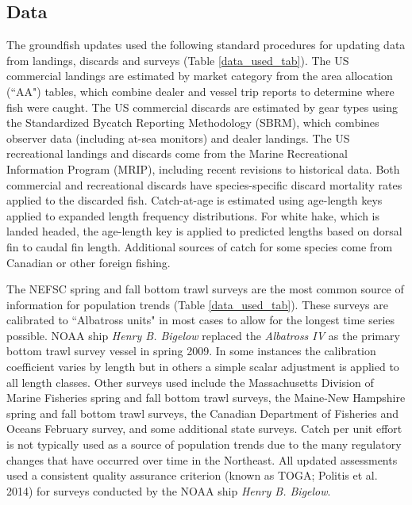 \subsection{Data}
The groundfish updates used the following standard procedures for updating data from landings, discards and surveys (Table \ref{data_used_tab}). The US commercial landings are estimated by market category from the area allocation (``AA") tables, which combine dealer and vessel trip reports to determine where fish were caught. The US commercial discards are estimated by gear types using the Standardized Bycatch Reporting Methodology (SBRM), which combines observer data (including at-sea monitors) and dealer landings. The US recreational landings and discards come from the Marine Recreational Information Program (MRIP), including recent revisions to historical data. Both commercial and recreational discards have species-specific discard mortality rates applied to the discarded fish. Catch-at-age is estimated using age-length keys applied to expanded length frequency distributions. For white hake, which is landed headed, the age-length key is applied to predicted lengths based on dorsal fin to caudal fin length.  Additional sources of catch for some species come from Canadian or other foreign fishing. 

The NEFSC spring and fall bottom trawl surveys are the most common source of information for population trends (Table \ref{data_used_tab}). These surveys are calibrated to ``Albatross units" in most cases to allow for the longest time series possible. NOAA ship \textit{Henry B. Bigelow} replaced the \textit{Albatross IV} as the primary bottom trawl survey vessel in spring 2009.  In some instances the calibration coefficient varies by length but in others a simple scalar adjustment is applied to all length classes. Other surveys used include the Massachusetts Division of Marine Fisheries spring and fall bottom trawl surveys, the Maine-New Hampshire spring and fall bottom trawl surveys, the Canadian Department of Fisheries and Oceans February survey, and some additional state surveys. Catch per unit effort is not typically used as a source of population trends due to the many regulatory changes that have occurred over time in the Northeast.  All updated assessments used a consistent quality assurance criterion  (known as TOGA; Politis et al. 2014) for surveys conducted by the NOAA ship \textit{Henry B. Bigelow}.

